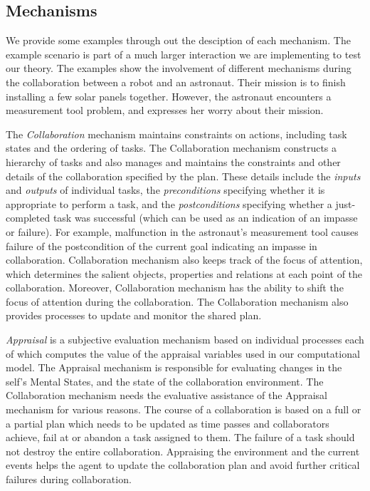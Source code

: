 \documentclass[letterpaper]{article}
\begin{document}
\subsection{Mechanisms}

We provide some examples through out the desciption of each mechanism. The
example scenario is part of a much larger interaction we are implementing to
test our theory. The examples show the involvement of different mechanisms
during the collaboration between a robot and an astronaut. Their mission is to
finish installing a few solar panels together. However, the astronaut encounters
a measurement tool problem, and expresses her worry about their mission.

The \textit{Collaboration} mechanism maintains constraints on actions, including
task states and the ordering of tasks. The Collaboration mechanism constructs a
hierarchy of tasks and also manages and maintains the constraints and other
details of the collaboration specified by the plan. These details include the
\textit{inputs} and \textit{outputs} of individual tasks, the
\textit{preconditions} specifying whether it is appropriate to perform a task,
and the \textit{postconditions} specifying whether a just-completed task was
successful (which can be used as an indication of an impasse or failure). For
example, malfunction in the astronaut's measurement tool causes failure of the
postcondition of the current goal indicating an impasse in collaboration.
Collaboration mechanism also keeps track of the focus of attention, which
determines the salient objects, properties and relations at each point of the
collaboration. Moreover, Collaboration mechanism has the ability to shift the
focus of attention during the collaboration. The Collaboration mechanism also
provides processes to update and monitor the shared plan.
  
\textit{Appraisal} is a subjective evaluation mechanism based on individual
processes each of which computes the value of the appraisal variables used in
our computational model. The Appraisal mechanism is responsible for evaluating
changes in the self's Mental States, and the state of the collaboration
environment. The Collaboration mechanism needs the evaluative assistance of the
Appraisal mechanism for various reasons. The course of a collaboration is based
on a full or a partial plan which needs to be updated as time passes and
collaborators achieve, fail at or abandon a task assigned to them. The failure
of a task should not destroy the entire collaboration. Appraising the
environment and the current events helps the agent to update the collaboration
plan and avoid further critical failures during collaboration. 
\end{document}
